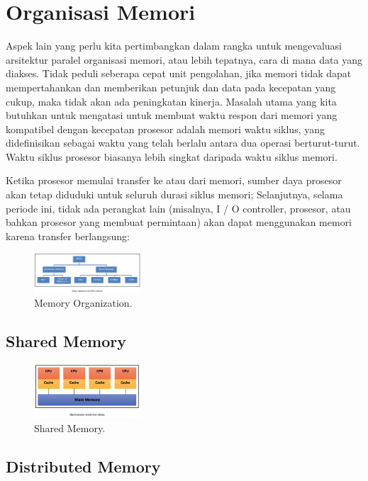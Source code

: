 \section{Organisasi Memori}
Aspek lain yang perlu kita pertimbangkan dalam rangka untuk mengevaluasi arsitektur paralel organisasi memori, atau lebih tepatnya, cara di mana data yang diakses. Tidak peduli seberapa cepat unit pengolahan, jika memori tidak dapat mempertahankan dan memberikan petunjuk dan data pada kecepatan yang cukup, maka tidak akan ada peningkatan kinerja. Masalah utama yang kita butuhkan untuk mengatasi untuk membuat waktu respon dari memori yang kompatibel dengan kecepatan prosesor adalah memori waktu siklus, yang didefinisikan sebagai waktu yang telah berlalu antara dua operasi berturut-turut. Waktu siklus prosesor biasanya lebih singkat daripada waktu siklus memori.

Ketika prosesor memulai transfer ke atau dari memori, sumber daya prosesor akan tetap diduduki untuk seluruh durasi siklus memori; Selanjutnya, selama periode ini, tidak ada perangkat lain (misalnya, I / O controller, prosesor, atau bahkan prosesor yang membuat permintaan) akan dapat menggunakan memori karena transfer berlangsung:
\begin{figure}[H]
	\includegraphics[width=4cm]{figures/kelompok2/chapter1/6.png}
	\centering
	\caption{Memory Organization.}
\end{figure}

\subsection{Shared Memory}

\begin{figure}[H]
	\includegraphics[width=4cm]{figures/kelompok2/chapter1/7.png}
	\centering
	\caption{Shared Memory.}
\end{figure}

\subsection{Distributed Memory}

